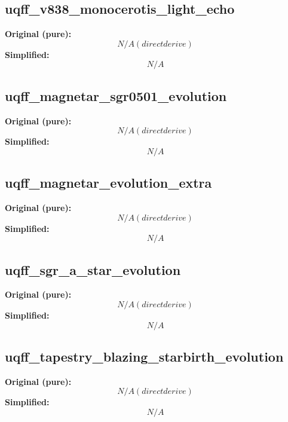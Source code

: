\subsection{uqff_v838_monocerotis_light_echo}
\textbf{Original (pure):}
\begin{equation}
N/A (direct derive)
\end{equation}
\textbf{Simplified:}
\begin{equation}
N/A
\end{equation}

\subsection{uqff_magnetar_sgr0501_evolution}
\textbf{Original (pure):}
\begin{equation}
N/A (direct derive)
\end{equation}
\textbf{Simplified:}
\begin{equation}
N/A
\end{equation}

\subsection{uqff_magnetar_evolution_extra}
\textbf{Original (pure):}
\begin{equation}
N/A (direct derive)
\end{equation}
\textbf{Simplified:}
\begin{equation}
N/A
\end{equation}

\subsection{uqff_sgr_a_star_evolution}
\textbf{Original (pure):}
\begin{equation}
N/A (direct derive)
\end{equation}
\textbf{Simplified:}
\begin{equation}
N/A
\end{equation}

\subsection{uqff_tapestry_blazing_starbirth_evolution}
\textbf{Original (pure):}
\begin{equation}
N/A (direct derive)
\end{equation}
\textbf{Simplified:}
\begin{equation}
N/A
\end{equation}

